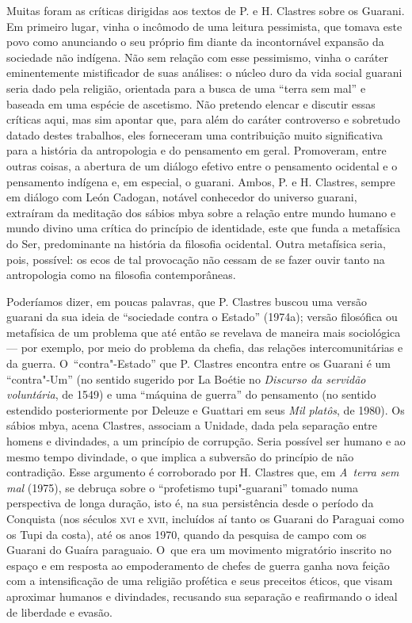 Muitas foram as críticas dirigidas aos textos de P. e H. Clastres sobre
os Guarani. Em primeiro lugar, vinha o incômodo de uma leitura
pessimista, que tomava este povo como anunciando o seu próprio fim
diante da incontornável expansão da sociedade não indígena. Não sem
relação com esse pessimismo, vinha o caráter eminentemente mistificador
de suas análises: o núcleo duro da vida social guarani seria dado pela
religião, orientada para a busca de uma ``terra sem mal'' e baseada em
uma espécie de ascetismo. Não pretendo elencar e discutir essas
críticas aqui, mas sim apontar que, para além do caráter controverso e
sobretudo datado destes trabalhos, eles forneceram uma contribuição
muito significativa para a história da antropologia e do pensamento em
geral. Promoveram, entre outras coisas, a abertura de um diálogo
efetivo entre o pensamento ocidental e o pensamento indígena e, em
especial, o guarani. Ambos, P. e H. Clastres, sempre em diálogo com
León Cadogan, notável conhecedor do universo guarani, extraíram da
meditação dos sábios mbya sobre a relação entre mundo humano e mundo
divino uma crítica do princípio de identidade, este que funda a
metafísica do Ser, predominante na história da filosofia ocidental.
Outra metafísica seria, pois, possível: os ecos de tal provocação não
cessam de se fazer ouvir tanto na antropologia como na filosofia
contemporâneas.

Poderíamos dizer, em poucas palavras, que P. Clastres buscou uma versão
guarani da sua ideia de ``sociedade contra o Estado'' (1974a); versão
filosófica ou metafísica de um problema que até então se revelava de
maneira mais sociológica --- por exemplo, por meio do problema da chefia,
das relações intercomunitárias e da guerra. O~``contra"-Estado'' que P.
Clastres encontra entre os Guarani é um ``contra"-Um'' (no sentido
sugerido por La Boétie no \emph{Discurso da servidão voluntária}, de 1549) e
uma ``máquina de guerra'' do pensamento (no sentido estendido
posteriormente por Deleuze e Guattari em seus \emph{Mil platôs}, de 1980). Os
sábios mbya, acena Clastres, associam a Unidade, dada pela separação
entre homens e divindades, a um princípio de corrupção. Seria possível
ser humano e ao mesmo tempo divindade, o que implica a subversão do
princípio de não contradição. Esse argumento é corroborado por H.
Clastres que, em \emph{A~terra sem mal} (1975), se debruça sobre o ``profetismo
tupi"-guarani'' tomado numa perspectiva de longa duração, isto é, na sua
persistência desde o período da Conquista (nos séculos \textsc{xvi} e \textsc{xvii},
incluídos aí tanto os Guarani do Paraguai como os Tupi da costa), até
os anos 1970, quando da pesquisa de campo com os Guarani do Guaíra
paraguaio. O~que era um movimento migratório inscrito no espaço e em
resposta ao empoderamento de chefes de guerra ganha nova feição com a
intensificação de uma religião profética e seus preceitos éticos, que
visam aproximar humanos e divindades, recusando sua separação e
reafirmando o ideal de liberdade e evasão.

